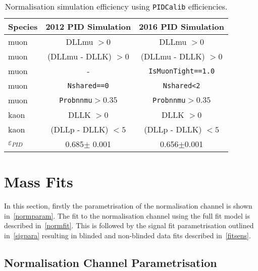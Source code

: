 \begin{table}[H]
\begin{center}
\begin{tabular}{l c c}\toprule

    Species  &2012 PID Simulation & 2016 PID Simulation\\ \hline
    muon &  DLLmu $ > 0$ & DLLmu $ > 0$ \\
    muon &  (DLLmu - DLLK) $ > 0$ & (DLLmu - DLLK) $ > 0$ \\
    muon &  - & \texttt{IsMuonTight==1.0}\\
    muon & \texttt{Nshared==0} & \texttt{Nshared<2} \\
    muon & \texttt{Probnnmu}$>0.35$ & \texttt{Probnnmu}$>0.35$ \\
    kaon &  DLLK $ > 0$ & DLLK $ > 0$ \\
    kaon &  (DLLp - DLLK) $ < 5$ & (DLLp - DLLK) $< 5$ \\
     \hline
    $\varepsilon_{PID}$ &0.685$\pm$ 0.001 & 0.656$\pm$0.001  \\

     \bottomrule
      \end{tabular}

\end{center}
\caption{Normalisation simulation efficiency using \texttt{PIDCalib} efficiencies.}
\label{tab:PIDselectionNorm}
\end{table}


\newpage
\section{Mass Fits}
In this section, firstly the parametrisation of the normalisation channel is shown in~\autoref{normparam}. The fit to the normalisation channel using the full fit model is described in~\autoref{normfit}. This is followed by the signal fit parametrisation outlined in~\autoref{sigpara} resulting in blinded and non-blinded data fits described in~\autoref{fitsens}.

\subsection{Normalisation Channel Parametrisation}
\label{normparam}

